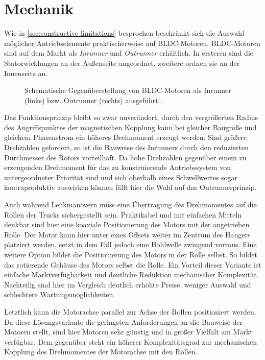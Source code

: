 \chapter{Mechanik}
	Wie in \cref{sec:constructive limitations} besprochen beschränkt sich die Auswahl möglicher Antriebselemente praktischerweise auf BLDC-Motoren.
	BLDC-Motoren sind auf dem Markt als \textit{Inrunner} und \textit{Outrunner} erhältlich.
	In ersteren sind die Statorwicklungen an der Außenseite angeordnet, zweitere ordnen sie an der Innenseite an.
	\begin{figure}[h]
		\centering
		
		\caption[Gegenüberstellung von Inrunner und Outrunner]{Schematische Gegenüberstellung von BLDC-Motoren als Inrunner (links) bzw. Outrunner (rechts) ausgeführt~\cite{inrunner.outrunner.2022}.}
		\label{fig:inrunner outrunner}
	\end{figure}
	Das Funktionsprinzip bleibt so zwar unverändert, durch den vergrößerten Radius des Angriffspunktes der magnetischen Kopplung kann bei gleicher Baugröße und gleichem Phasenstrom ein höheres Drehmoment erzeugt werden.
	Sind größere Drehzahlen gefordert, so ist die Bauweise des Inrunners durch den reduzierten Durchmesser des Rotors vorteilhaft.
	Da hohe Drehzahlen gegenüber einem zu erzeugenden Drehmoment für das zu konstruierende Antriebssystem von untergeordneter Priorität sind und sich oberhalb eines Schwellwertes sogar kontraproduktiv auswirken können fällt hier die Wahl auf das Outrunnerprinzip.\par\medskip
	Auch während Lenkmanövern muss eine Übertragung des Drehmomentes auf die Rollen der Trucks sichergestellt sein.
	Praktikabel und mit einfachen Mitteln denkbar sind hier eine koaxiale Positionierung des Motors mit der angetrieben Rolle.
	Der Motor kann hier unter eines Offsets weiter im Zentrum des Hangers platziert werden, setzt in dem Fall jedoch eine Hohlwelle zwingend vorraus.
	Eine weitere Option bildet die Positionierung des Motors in der Rolle selbst.
	So bildet das rotierende Gehäuse des Motors selbst die Rolle.
	Ein Vorteil dieser Variante ist einfache Marktverfügbarkeit und deutliche Reduktion mechanischer Komplexität.
	Nachteilig sind hier im Vergleich deutlich erhöhte Preise, weniger Auswahl und schlechtere Wartungsmöglichkeiten.\par
	Letztlich kann die Motorachse parallel zur Achse der Rollen positioniert werden.
	Da diese Lösungsvariante die geringsten Anforderungen an die Bauweise der Motoren stellt, sind hier Motoren sehr günstig und in großer Vielfalt am Markt verfügbar.
	Dem gegenüber steht ein höherer Komplexitätsgrad zur mechanischen Kopplung des Drehmomentes der Motorachse mit den Rollen.